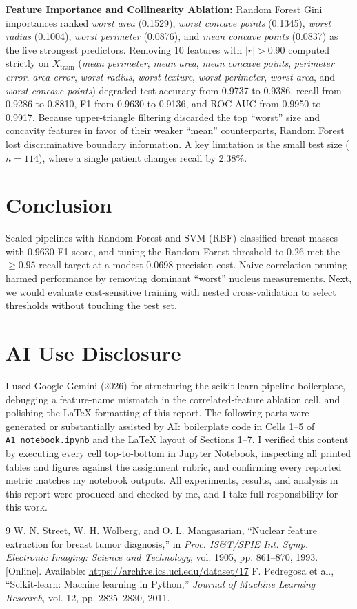 \documentclass[conference,a4paper]{IEEEtran}
\begin{document}
\textbf{Feature Importance and Collinearity Ablation:} Random Forest Gini importances ranked \textit{worst area} (0.1529), \textit{worst concave points} (0.1345), \textit{worst radius} (0.1004), \textit{worst perimeter} (0.0876), and \textit{mean concave points} (0.0837) as the five strongest predictors. Removing 10 features with $|r| > 0.90$ computed strictly on $X_{\text{train}}$ (\textit{mean perimeter}, \textit{mean area}, \textit{mean concave points}, \textit{perimeter error}, \textit{area error}, \textit{worst radius}, \textit{worst texture}, \textit{worst perimeter}, \textit{worst area}, and \textit{worst concave points}) degraded test accuracy from 0.9737 to 0.9386, recall from 0.9286 to 0.8810, F1 from 0.9630 to 0.9136, and ROC-AUC from 0.9950 to 0.9917. Because upper-triangle filtering discarded the top ``worst'' size and concavity features in favor of their weaker ``mean'' counterparts, Random Forest lost discriminative boundary information. A key limitation is the small test size ($n = 114$), where a single patient changes recall by 2.38\%.

\section{Conclusion}
Scaled pipelines with Random Forest and SVM (RBF) classified breast masses with 0.9630 F1-score, and tuning the Random Forest threshold to 0.26 met the $\ge 0.95$ recall target at a modest 0.0698 precision cost. Naive correlation pruning harmed performance by removing dominant ``worst'' nucleus measurements. Next, we would evaluate cost-sensitive training with nested cross-validation to select thresholds without touching the test set.

\section*{AI Use Disclosure}
I used Google Gemini (2026) for structuring the scikit-learn pipeline boilerplate, debugging a feature-name mismatch in the correlated-feature ablation cell, and polishing the LaTeX formatting of this report. The following parts were generated or substantially assisted by AI: boilerplate code in Cells 1--5 of \texttt{A1\_notebook.ipynb} and the LaTeX layout of Sections 1--7. I verified this content by executing every cell top-to-bottom in Jupyter Notebook, inspecting all printed tables and figures against the assignment rubric, and confirming every reported metric matches my notebook outputs. All experiments, results, and analysis in this report were produced and checked by me, and I take full responsibility for this work.

\begin{thebibliography}{9}
 W. N. Street, W. H. Wolberg, and O. L. Mangasarian, ``Nuclear feature extraction for breast tumor diagnosis,'' in \textit{Proc. IS\&T/SPIE Int. Symp. Electronic Imaging: Science and Technology}, vol. 1905, pp. 861--870, 1993. [Online]. Available: \url{https://archive.ics.uci.edu/dataset/17}
 F. Pedregosa et al., ``Scikit-learn: Machine learning in Python,'' \textit{Journal of Machine Learning Research}, vol. 12, pp. 2825--2830, 2011.
\end{thebibliography}
\end{document}
